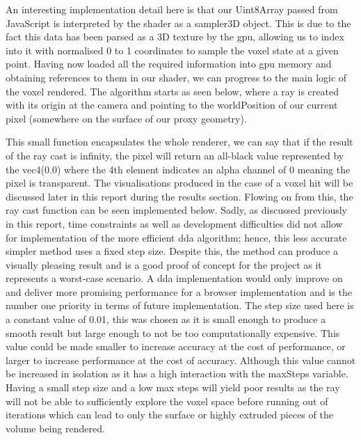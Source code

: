 \documentclass[titlepage]{article}
\begin{document}



An interesting implementation detail here is that our Uint8Array passed from JavaScript is interpreted by the shader as a sampler3D object. This is due to the fact this data has been parsed as a 3D texture by the \gls{gpu}, allowing us to index into it with normalised 0 to 1 coordinates to sample the voxel state at a given point. Having now loaded all the required information into \gls{gpu} memory and obtaining references to them in our shader, we can progress to the main logic of the voxel rendered. The algorithm starts as seen below, where a ray is created with its origin at the camera and pointing to the worldPosition of our current pixel (somewhere on the surface of our proxy geometry).



This small function encapsulates the whole renderer, we can say that if the result of the ray cast is infinity, the pixel will return an all-black value represented by the vec4(0.0) where the 4th element indicates an alpha channel of 0 meaning the pixel is transparent. The visualisations produced in the case of a voxel hit will be discussed later in this report during the results section. Flowing on from this, the ray cast function can be seen implemented below. Sadly, as discussed previously in this report, time constraints as well as development difficulties did not allow for implementation of the more efficient \gls{dda} algorithm; hence, this less accurate simpler method uses a fixed step size. Despite this, the method can produce a visually pleasing result and is a good proof of concept for the project as it represents a worst-case scenario. A \gls{dda} implementation would only improve on and deliver more promising performance for a browser implementation and is the number one priority in terms of future implementation. The step size used here is a constant value of 0.01, this was chosen as it is small enough to produce a smooth result but large enough to not be too computationally expensive. This value could be made smaller to increase accuracy at the cost of performance, or larger to increase performance at the cost of accuracy. Although this value cannot be increased in isolation as it has a high interaction with the maxSteps variable. Having a small step size and a low max steps will yield poor results as the ray will not be able to sufficiently explore the voxel space before running out of iterations which can lead to only the surface or highly extruded pieces of the volume being rendered.
\end{document}
